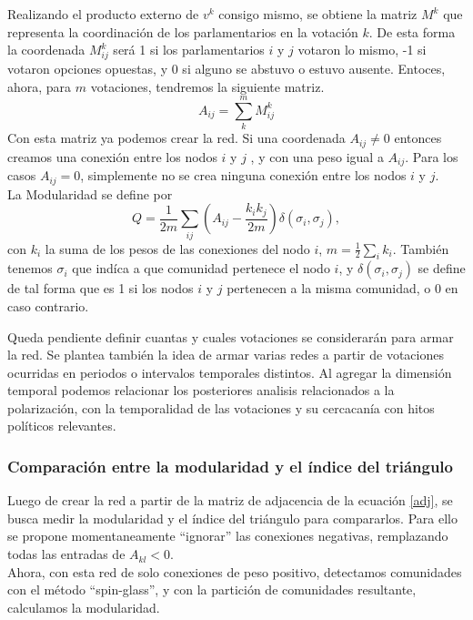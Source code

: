 \documentclass{proyectotesis}
\begin{document}
Realizando el producto externo de $v^k$ consigo mismo, se obtiene la matriz $M^k$ que representa la coordinación de los parlamentarios en la votación $k$. De esta forma la coordenada $M^k_{ij}$ será 1 si los parlamentarios $i$ y $j$ votaron lo mismo, -1 si votaron opciones opuestas, y 0 si alguno se abstuvo o estuvo ausente. Entoces, ahora, para $m$ votaciones, tendremos la siguiente matriz.
\begin{equation}
    A_{ij} = \sum_k^m M^k_{ij} \label{adj}
\end{equation}
Con esta matriz ya podemos crear la red. Si una coordenada $A_{ij}\neq 0$ entonces creamos una conexión entre los nodos $i$ y $j$ , y con una peso igual a $A_{ij}$. Para los casos $A_{ij} = 0$, simplemente no se crea ninguna conexión entre los nodos $i$ y $j$.\\

La Modularidad se define por
\begin{equation}
    Q = \frac{1}{2m}\sum_{ij} \left( A_{ij} - \frac{k_i k_j}{2m}  \right) \delta(\sigma_i,\sigma_j) \label{mod}
,\end{equation}
con $k_i$ la suma de los pesos de las conexiones del nodo $i$, $m = \frac{1}{2} \sum_i k_i$. También tenemos $\sigma_i$ que indíca a que comunidad pertenece el nodo $i$, y $\delta(\sigma_i,\sigma_j)$ se define de tal forma que es 1 si los nodos $i$ y $j$ pertenecen a la misma comunidad, o 0 en caso contrario.

Queda pendiente definir cuantas y cuales votaciones se considerarán para armar la red. Se plantea también la idea de armar varias redes a partir de votaciones ocurridas en periodos o intervalos temporales distintos. Al agregar la dimensión temporal podemos relacionar los posteriores analisis relacionados a la polarización, con la temporalidad de las votaciones y su cercacanía con hitos políticos relevantes.

\subsubsection{Comparación entre la modularidad y el índice del triángulo} 
Luego de crear la red a partir de la matriz de adjacencia de la ecuación \eqref{adj}, se busca medir la modularidad y el índice del triángulo para compararlos. Para ello se propone momentaneamente ``ignorar'' las conexiones negativas, remplazando todas las entradas de $A_{kl} < 0$.\\ 

Ahora, con esta red de solo conexiones de peso positivo, detectamos comunidades con el método ``spin-glass'', y con la partición de comunidades resultante, calculamos la modularidad. 
\end{document}
